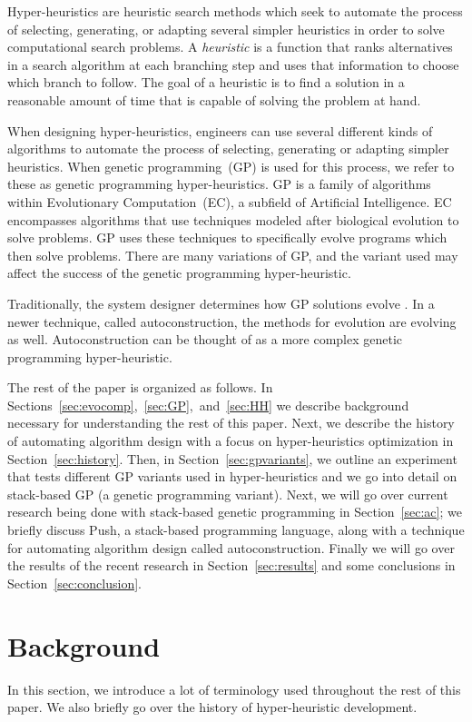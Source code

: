 \documentclass{sig-alternate}
\begin{document}
Hyper-heuristics are heuristic search methods which seek to automate the process of selecting, generating, or adapting several simpler heuristics in order to solve computational search problems. A \textit{heuristic} is a function that ranks alternatives in a search algorithm at each branching step and uses that information to choose which branch to follow. The goal of a heuristic is to find a solution in a reasonable amount of time that is capable of solving the problem at hand.

When designing hyper-heuristics, engineers can use several different kinds of algorithms to automate the process of selecting, generating or adapting simpler heuristics. When genetic programming~(GP) is used for this process, we refer to these as genetic programming hyper-heuristics. GP is a family of algorithms within Evolutionary Computation~(EC), a subfield of Artificial Intelligence. EC encompasses algorithms that use techniques modeled after biological evolution to solve problems. GP uses these techniques to specifically evolve programs which then solve problems. There are many variations of GP, and the variant used may affect the success of the genetic programming hyper-heuristic.

Traditionally, the system designer determines how GP solutions evolve \cite{spector:2016}. In a newer technique, called autoconstruction, the methods for evolution are evolving as well. Autoconstruction can be thought of as a more complex genetic programming hyper-heuristic.

The rest of the paper is organized as follows. In Sections~\ref{sec:evocomp},~\ref{sec:GP},~and~\ref{sec:HH} we describe background necessary for understanding the rest of this paper. Next, we describe the history of automating algorithm design with a focus on hyper-heuristics optimization in Section~\ref{sec:history}. Then, in Section~\ref{sec:gpvariants}, we outline an experiment that tests different GP variants used in hyper-heuristics and we go into detail on stack-based GP (a genetic programming variant). Next, we will go over current research being done with stack-based genetic programming in Section~\ref{sec:ac}; we briefly discuss Push, a stack-based programming language, along with a technique for automating algorithm design called autoconstruction. Finally we will go over the results of the recent research in Section~\ref{sec:results} and some conclusions in Section~\ref{sec:conclusion}.

\section{Background}
\label{sec:background}
In this section, we introduce a lot of terminology used throughout the rest of this paper. We also briefly go over the history of hyper-heuristic development.
\end{document}
